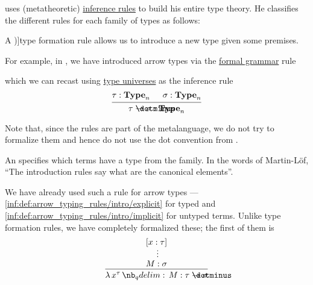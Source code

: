 \begin{remark}\label{rem:type_theory_rule_classification}
   uses (metatheoretic) \hyperref[def:inference_rule]{inference rules} to build his entire type theory. He classifies the different rules for each family of types as follows:
  \begin{thmenum}
     A \term[en=formation (rule) (\cite[\S 8.1.9]{Mimram2020ProgramEqualsProof})]{type formation} rule allows us to introduce a new type given some premises.

    For example, in , we have introduced arrow types via the \hyperref[def:formal_grammar/schema]{formal grammar} rule
    \begin{bnf*}
       {\bnftsq{(} \bnfsp {} \bnfsp \bnftsq{\( \synimplies \)} \bnfsp {} \bnfsp \bnftsq{)}}
    \end{bnf*}
    which we can recast using \hyperref[rem:type_universes]{type universes} as the inference rule
    \begin{equation*}
      \begin{prooftree}
        \hypo{ \tau: \op*{Type}_n }
        \hypo{ \sigma: \op*{Type}_n }
        \infer2{ \tau \synimplies \sigma: \op*{Type}_n }
      \end{prooftree}
    \end{equation*}

    Note that, since the rules are part of the metalanguage, we do not try to formalize them and hence do not use the dot convention from .

     An  specifies which terms have a type from the family. In the words of Martin-L\"of, \enquote{The introduction rules say what are the canonical elements}.

    We have already used such a rule for arrow types --- \ref{inf:def:arrow_typing_rules/intro/explicit} for typed and \ref{inf:def:arrow_typing_rules/intro/implicit} for untyped terms. Unlike type formation rules, we have completely formalized these; the first of them is
    \begin{equation*}
      \begin{prooftree}
        \hypo{ [x: \tau] }
        \ellipsis {} { M: \sigma }
        \infer1{ \qabs {x^{\tau}} M: \tau \synimplies \sigma }
      \end{prooftree}
    \end{equation*}


\end{thmenum}
\end{remark}
